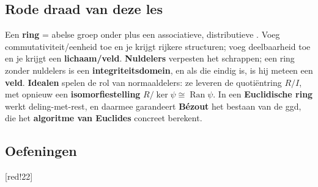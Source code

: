\subsection{Rode draad van deze les}
 
\begin{roundbox}[CornflowerBlue!10][RoyalPurple]
    Een \textbf{ring} = abelse groep onder \inlinetext{$+$} plus een associatieve, distributieve \inlinetext{$\cdot$}. Voeg commutativiteit/eenheid toe en je krijgt rijkere structuren; voeg deelbaarheid toe en je krijgt een \textbf{lichaam/veld}. \newline\textbf{Nuldelers} verpesten het schrappen; een ring zonder nuldelers is een \textbf{integriteitsdomein}, en als die eindig is, is hij meteen een \textbf{veld}. \newline\textbf{Idealen} spelen de rol van normaaldelers: ze leveren de quotiëntring $R/I$, met opnieuw een \textbf{isomorfiestelling} $R/\operatorname{ker}\psi \cong \operatorname{Ran}\psi$. \newline In een \textbf{Euclidische ring} werkt deling-met-rest, en daarmee garandeert \textbf{Bézout} het bestaan van de ggd, die het \textbf{algoritme van Euclides} concreet berekent.
\end{roundbox}

\subsection{Oefeningen}

 [red!22]  